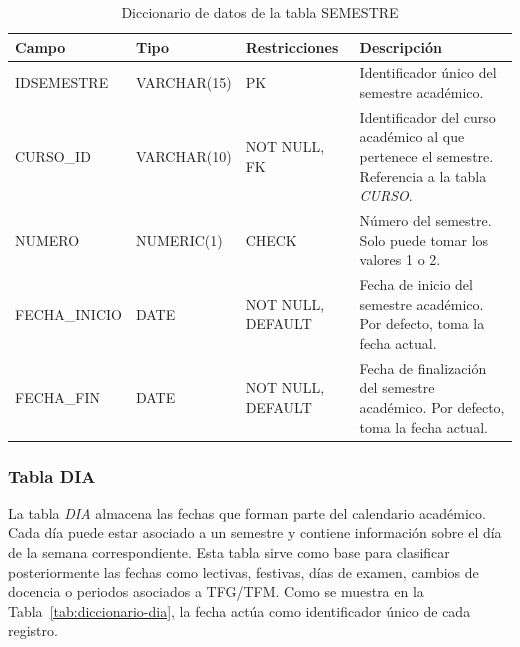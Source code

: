 \begin{table}[H]
	\centering
	\scriptsize
	\setlength{\tabcolsep}{3pt}
	\renewcommand{\arraystretch}{1.15}
	\begin{tabularx}{\textwidth}{@{}
			>{\raggedright\arraybackslash}p{2.6cm}
			>{\raggedright\arraybackslash}p{2.2cm}
			>{\raggedright\arraybackslash}p{2.2cm}
			X@{}}
		\toprule
		\textbf{Campo} & \textbf{Tipo} & \textbf{Restricciones} & \textbf{Descripción} \\
		\midrule
		IDSEMESTRE & VARCHAR(15) & PK & Identificador único del semestre académico. \\
		CURSO\_ID & VARCHAR(10) & NOT NULL, FK & Identificador del curso académico al que pertenece el semestre. Referencia a la tabla \textit{CURSO}. \\
		NUMERO & NUMERIC(1) & CHECK & Número del semestre. Solo puede tomar los valores 1 o 2. \\
		FECHA\_\newline INICIO & DATE & NOT NULL, DEFAULT & Fecha de inicio del semestre académico. Por defecto, toma la fecha actual. \\
		FECHA\_FIN & DATE & NOT NULL, DEFAULT & Fecha de finalización del semestre académico. Por defecto, toma la fecha actual. \\
		\bottomrule
	\end{tabularx}
	\caption{Diccionario de datos de la tabla SEMESTRE}
	\label{tab:diccionario-semestre}
\end{table}

\subsubsection{Tabla DIA}

 La tabla \textit{DIA} almacena las fechas que forman parte del calendario académico. Cada día puede estar asociado a un semestre y contiene información sobre el día de la semana correspondiente. Esta tabla sirve como base para clasificar posteriormente las fechas como lectivas, festivas, días de examen, cambios de docencia o periodos asociados a TFG/TFM. Como se muestra en la Tabla~\ref{tab:diccionario-dia}, la fecha actúa como identificador único de cada registro.\\

